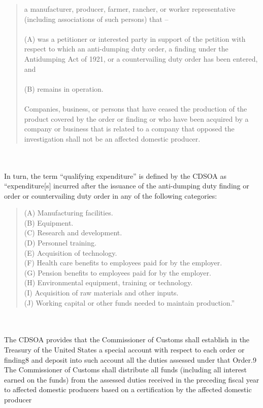 \begin{tcolorbox}[breakable]
\blockquote{
    a manufacturer, producer, farmer, rancher, or worker representative (including
associations of such persons) that – \\\\
        (A) was a petitioner or interested party in support of the petition with respect
to which an anti-dumping duty order, a finding under the Antidumping Act of 1921,
or a countervailing duty order has been entered, and \\\\
\quad \quad (B) remains in operation. \\\\
Companies, business, or persons that have ceased the production of the product
covered by the order or finding or who have been acquired by a company or business
that is related to a company that opposed the investigation shall not be an affected
domestic producer.
}
\\\\
 \quad In turn, the term “qualifying expenditure” is defined by the CDSOA as “expenditure[s]
incurred after the issuance of the anti-dumping duty finding or order or countervailing duty order in
any of the following categories:
\blockquote{
(A) Manufacturing facilities.\\
(B) Equipment.\\
(C) Research and development.\\
(D) Personnel training.\\
(E) Acquisition of technology.\\
(F) Health care benefits to employees paid for by the employer.\\
(G) Pension benefits to employees paid for by the employer.\\
(H) Environmental equipment, training or technology.\\
(I) Acquisition of raw materials and other inputs.\\
(J) Working capital or other funds needed to maintain production.”
}
\\\\
 \quad The CDSOA provides that the Commissioner of Customs shall establish in the Treasury of
the United States a special account with respect to each order or finding8
 and deposit into such
account all the duties assessed under that Order.9
 The Commissioner of Customs shall distribute all
funds (including all interest earned on the funds) from the assessed duties received in the preceding
fiscal year to affected domestic producers based on a certification by the affected domestic producer

\end{tcolorbox}
